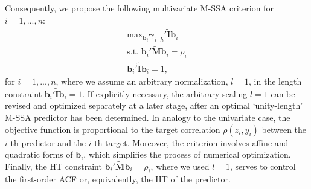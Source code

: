 \documentclass[11pt,a4paper]{article}
\begin{document}
Consequently, we propose the following multivariate M-SSA criterion for $i=1,...,n$: 
\begin{eqnarray}\label{mcrit1}
\textrm{max}_{\mathbf{b}_i}\boldsymbol{\gamma}_{i\cdot h}'\tilde{\mathbf{I}}\mathbf{b}_{i}\\
\textrm{s.t.~}\mathbf{b}_{i}'\tilde{\mathbf{M}}\mathbf{b}_{i}=\rho_i\nonumber\\
\mathbf{b}_{i}'\tilde{\mathbf{I}}\mathbf{b}_{i}=1,\nonumber
\end{eqnarray}
for $i=1,...,n$, where we assume an arbitrary normalization, $l=1$, in the length constraint $\mathbf{b}_{i}'\tilde{\mathbf{I}}\mathbf{b}_{i}=1$. If explicitly necessary, the arbitrary scaling $l=1$ can be revised and optimized separately at a later stage, after an optimal `unity-length' M-SSA predictor has been determined. In analogy to the univariate case, the objective function is proportional to the target correlation $\rho(z_i,y_i)$ between the $i$-th predictor and the $i$-th target.  Moreover, the criterion involves affine and quadratic forms of $\mathbf{b}_i$, which simplifies the process of numerical optimization. Finally, the HT constraint $\mathbf{b}_{i}'\tilde{\mathbf{M}}\mathbf{b}_{i}=\rho_i$, where we used $l=1$, serves to control the first-order ACF or, equivalently, the HT of the predictor.  \\
\end{document}
